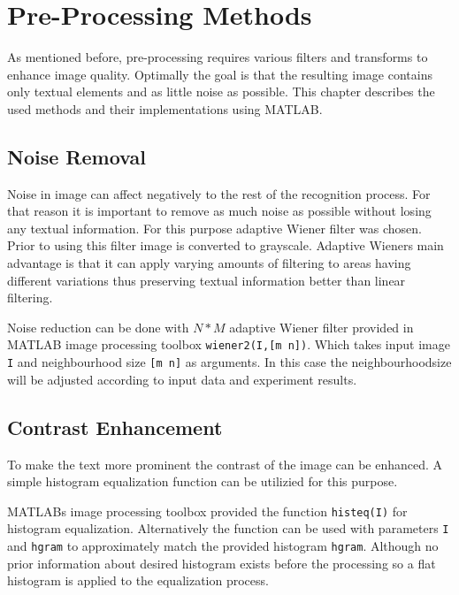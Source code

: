 \documentclass{article}
\def\code#1{\texttt{#1}}
\begin{document}
  \newpage
  \section{Pre-Processing Methods}
  As mentioned before, pre-processing requires various filters and transforms to enhance image quality. Optimally the goal is that the resulting image contains only textual elements and as little noise as possible. This chapter describes the used methods and their implementations using MATLAB.

        \subsection{Noise Removal}
          Noise in image can affect negatively to the rest of the recognition process. For that reason it is important to remove as much noise as possible without losing any textual information. For this purpose adaptive Wiener filter was chosen. Prior to using this filter image is converted to grayscale. Adaptive Wieners main advantage is that it can apply varying amounts of filtering to areas having different variations thus preserving textual information better than linear filtering.\cite{TheMathWorksWiener}

          Noise reduction can be done with $N * M$ adaptive Wiener filter provided in MATLAB image processing toolbox \code{wiener2(I,[m n])}. Which takes input image \code{I} and neighbourhood size \code{[m n]} as arguments. In this case the neighbourhoodsize will be adjusted according to input data and experiment results.

        \subsection{Contrast Enhancement}
          To make the text more prominent the contrast of the image can be enhanced. A simple histogram equalization function can be utilizied for this purpose.

          MATLABs image processing toolbox provided the function \code{histeq(I)} for histogram equalization. Alternatively the function can be used with parameters \code{I} and \code{hgram} to approximately match the provided histogram \code{hgram}. Although no prior information about desired histogram exists before the processing so a flat histogram is applied to the equalization process.
\end{document}
